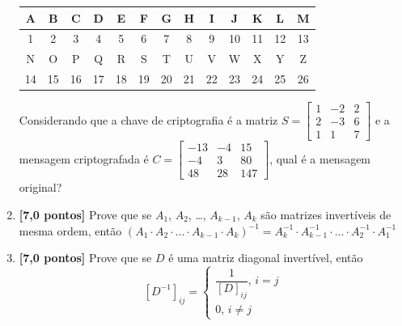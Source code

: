 \documentclass[12pt,a4paper]{article}
\begin{document}
\begin{enumerate}
    \begin{center}
      \begin{tabular}{|c|c|c|c|c|c|c|c|c|c|c|c|c|}
      \hline 
      A & B & C & D & E & F & G & H & I & J & K & L & M\\
      \hline 
      1 & 2 & 3 & 4 & 5 & 6 & 7 & 8 & 9 & 10 & 11 & 12 & 13\\
      \hline 
      \hline 
      N & O & P & Q & R & S & T & U & V & W & X & Y & Z\\
      \hline 
      14 & 15 & 16 & 17 & 18 & 19 & 20 & 21 & 22 & 23 & 24 & 25 & 26\\
      \hline 
      \end{tabular}
  \end{center}

  Considerando que a chave de criptografia é a matriz
    $S=\begin{bmatrix}
      1 & -2 & 2\\
      2 & -3 & 6\\
      1 & 1 & 7
    \end{bmatrix}$ e a mensagem criptografada é
    $C=\begin{bmatrix}
      -13 & -4 & 15 \\
      -4 & 3 & 80 \\
      48 & 28 & 147
      \end{bmatrix}$, qual é a mensagem original?
  
  \item \textbf{[7,0 pontos]} Prove que se $A_1$, $A_2$, \ldots, $A_{k-1}$, $A_k$ são matrizes
  invertíveis de mesma ordem, então
  $\left(A_1\cdot A_2 \cdot \ldots \cdot A_{k-1} \cdot A_k\right)^{-1} = A_k^{-1}\cdot A_{k-1}^{-1}\cdot\ldots\cdot A_2^{-1}\cdot A_1^{-1}$

  \item \textbf{[7,0 pontos]} Prove que se $D$ é uma matriz diagonal invertível, então
    $$\left[D^{-1}\right]_{ij} = \begin{cases}\dfrac{1}{[D]_{ij}},\,i = j\\ 0,\, i\neq j\end{cases}$$
    
  \end{enumerate}
\end{document}
